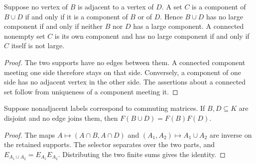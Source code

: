 \begin{lemma}
    \label{thm:clusters_separated_supports}
    \leanok

    Suppose no vertex of $B$ is adjacent to a vertex of $D$.
    A set $C$ is a component of $B\cup D$ if and only if it is a
    component of $B$ or of $D$. Hence $B\cup D$ has no large component
    if and only if neither $B$ nor $D$ has a large component.
    A connected nonempty set $C$ is its own component and has no
    large component if and only if $C$ itself is not large.
\end{lemma}
\begin{proof}\leanok
    The two supports have no edges between them. A connected component
    meeting one side therefore stays on that side. Conversely, a
    component of one side has no adjacent vertex in the other side.
    The assertions about a connected set follow from uniqueness of
    a component meeting it.
\end{proof}

\begin{lemma}
    \label{thm:retained_separated_sum_product}
    \leanok

    Suppose nonadjacent labels correspond to commuting matrices.
    If $B,D\subseteq K$ are disjoint and no edge joins them, then
    $F(B\cup D)=F(B)F(D)$.
\end{lemma}
\begin{proof}\leanok
    The maps $A\mapsto(A\cap B,A\cap D)$ and
    $(A_1,A_2)\mapsto A_1\cup A_2$ are inverse on the retained
    supports. The selector separates over the two parts, and
    $E_{A_1\cup A_2}=E_{A_1}E_{A_2}$. Distributing the two finite
    sums gives the identity.
\end{proof}

